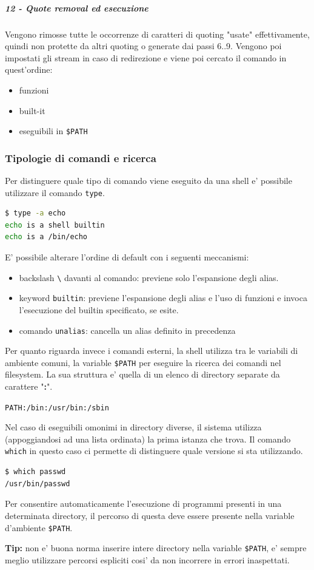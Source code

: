\subparagraph{12 - Quote removal ed esecuzione}
Vengono rimosse tutte le occorrenze di caratteri di quoting "usate" effettivamente, quindi non protette
da altri quoting o generate dai passi 6..9. Vengono poi impostati gli stream in caso di redirezione e viene
poi cercato il comando in quest'ordine:
\begin{itemize}
	\item funzioni
	\item built-it
	\item eseguibili in \texttt{\$PATH}
\end{itemize}

\subsubsection{Tipologie di comandi e ricerca}
Per distinguere quale tipo di comando viene eseguito da una shell e' possibile utilizzare il comando 
\texttt{type}.

\begin{lstlisting}[language=bash,basicstyle=\ttfamily,frame=single]
$ type -a echo
echo is a shell builtin
echo is a /bin/echo
\end{lstlisting}
E' possibile alterare l'ordine di default con i seguenti meccanismi:
\begin{itemize}
	\item backslash \texttt{\textbackslash} davanti al comando: previene solo l'espansione degli alias.
	\item keyword \texttt{builtin}: previene l'espansione degli alias e l'uso di funzioni e invoca
		l'esecuzione del builtin specificato, se esite.
	\item comando \texttt{unalias}: cancella un alias definito in precedenza
\end{itemize}

Per quanto riguarda invece i comandi esterni, la shell utilizza tra le variabili di ambiente comuni,
la variable \texttt{\$PATH} per eseguire la ricerca dei comandi nel filesystem. La sua struttura e' quella
di un elenco di directory separate da carattere "\textbf{:}".
\begin{center}
	\texttt{PATH:/bin:/usr/bin:/sbin}
\end{center}
Nel caso di eseguibili omonimi in directory diverse, il sistema utilizza (appoggiandosi ad una lista ordinata)
la prima istanza che trova. Il comando \texttt{which} in questo caso ci permette di distinguere quale versione
si sta utilizzando.


\begin{lstlisting}[language=bash,basicstyle=\ttfamily,frame=single]
$ which passwd
/usr/bin/passwd
\end{lstlisting}
Per consentire automaticamente l'esecuzione di programmi presenti in una determinata directory, il percorso
di questa deve essere presente nella variable d'ambiente \texttt{\$PATH}.

\textbf{Tip:} non e' buona norma inserire intere directory nella variable \texttt{\$PATH}, e' 
sempre meglio utilizzare
percorsi espliciti cosi' da non incorrere in errori inaspettati.


